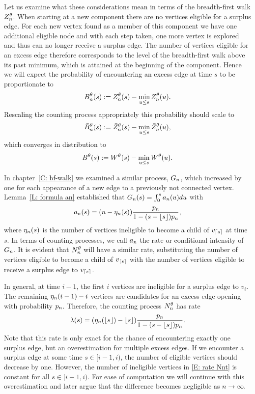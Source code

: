 Let us examine what these considerations mean in terms of the breadth-first walk $Z_n^{\theta}$.
When starting at a new component there are no vertices eligible for a surplus edge.
For each new vertex found as a member of this component we have one additional eligible node 
and with each step taken, one more vertex is explored and thus can no longer receive a surplus edge.
The number of vertices eligible for an excess edge therefore corresponds to the level of the breadth-first walk above its past minimum,
which is attained at the beginning of the component.
Hence we will expect the probability of encountering an excess edge at time $s$ to be proportionate to
\begin{equation}
B_n^{\theta}(s) := Z_n^{\theta}(s) - \min_{u \leq s}Z_n^{\theta}(u).
\end{equation}
Rescaling the counting process appropriately this probability should scale to
\begin{equation}
\bar{B}_n^{\theta}(s) := \bar{Z}^{\theta}_n(s) - \min_{u \leq s}\bar{Z}^{\theta}_n(u),
\end{equation}
which converges in distribution to
\begin{equation}
B^{\theta}(s) := W^{\theta}(s) - \min_{u \leq s}W^{\theta}(u). 
\end{equation}

In chapter~\ref{C: bf-walk} we examined a similar process, $G_n$, 
which increased by one for each appearance of a new edge to a previously not connected vertex.
Lemma~\ref{L: formula an} established that $G_n(s) = \int_{0}^{s} a_n(u)du$ with
\begin{equation*}
	a_n(s) = (n - \eta_n(s)) \frac{p_n}{1-(s-\lfloor s\rfloor)p_n},
\end{equation*}
where $\eta_n(s)$ is the number of vertices ineligible to become a child of $v_{\lceil s\rceil}$ at time $s$.
In terms of counting processes, we call $a_n$ the rate or conditional intensity of $G_n$.
It is evident that $N_n^{\theta}$ will have a similar rate,
substituting the number of vertices eligible to become a child of $v_{\lceil s\rceil}$ with the number of vertices eligible to receive a surplus edge to $v_{\lceil s\rceil}$.

In general, at time $i-1$, the first $i$ vertices are ineligible for a surplus edge to $v_i$.
The remaining $\eta_n(i-1) - i$ vertices are candidates for an excess edge opening with probability $p_n$.
Therefore, the counting process $N_n^{\theta}$ has rate
\begin{equation} \label{E: rate Nnt}
\lambda(s) = (\eta_n(\lfloor s\rfloor) - \lfloor s\rfloor) \frac{p_n}{1-(s-\lfloor s\rfloor)p_n}.
\end{equation}
Note that this rate is only exact for the chance of encountering exactly one surplus edge, 
but an overestimation for multiple excess edges.
If we encounter a surplus edge at some time $s \in [i-1, i)$,
the number of eligible vertices should decrease by one.
However, the number of ineligible vertices in \eqref{E: rate Nnt} is constant for all $s \in [i-1, i)$.
For ease of computation we will continue with this overestimation and later argue that the difference becomes negligible as $n \rightarrow \infty$.

